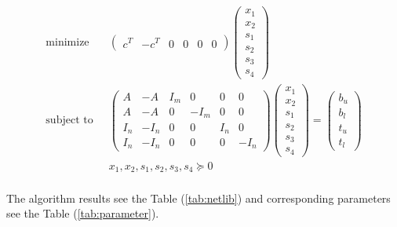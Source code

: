 \documentclass[a4paper]{article}
\begin{document}
\begin{equation}
\begin{split}\textrm{minimize} \quad  & 
\left( \begin{array}{cccccc}   
c^T & -c^T & 0 & 0 & 0 & 0    
\end{array} \right)
\left( \begin{array}{c}   
x_1\\ 
x_2\\ 
s_1\\
s_2\\
s_3\\
s_4     
\end{array} \right)\\
\textrm{subject to} & 
\left( \begin{array}{cccccc}   
A & -A & I_m  & 0 & 0 & 0 \\   
A & -A & 0 & -I_m & 0 & 0 \\  
I_n & -I_n & 0 & 0 & I_n & 0 \\   
I_n & -I_n & 0 & 0 & 0 & -I_n     
\end{array} \right)
\left( \begin{array}{c}   
x_1\\ 
x_2\\ 
s_1\\
s_2\\
s_3\\
s_4     
\end{array} \right) =
\left( \begin{array}{c}   
b_u\\ 
b_l\\ 
t_u\\
t_l    
\end{array} \right)
 \\
& x_1,x_2,s_1,s_2,s_3,s_4\succeq 0\\
\end{split}
\end{equation}

The algorithm results see the Table (\ref{tab:netlib}) and corresponding parameters see the Table (\ref{tab:parameter}).
\end{document}
